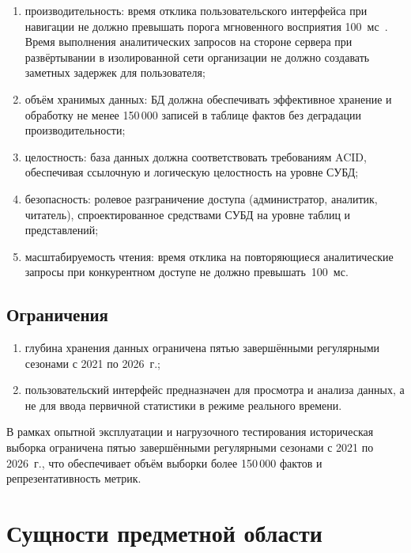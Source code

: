 \begin{enumerate}
    \item производительность: время отклика пользовательского интерфейса
          при навигации не должно превышать порога мгновенного восприятия
          100~мс~\cite{nielsen93}. Время выполнения аналитических запросов
          на стороне сервера при развёртывании в изолированной сети организации
          не должно создавать заметных задержек для пользователя;
    \item объём хранимых данных: БД должна обеспечивать эффективное хранение
          и обработку не менее 150\,000 записей в таблице фактов без
          деградации производительности;
    \item целостность: база данных должна соответствовать требованиям
          ACID, обеспечивая ссылочную и логическую целостность на уровне СУБД;
    \item безопасность: ролевое разграничение доступа (администратор,
          аналитик, читатель), спроектированное средствами СУБД на уровне таблиц
          и представлений;
    \item масштабируемость чтения: время отклика на повторяющиеся аналитические
          запросы при конкурентном доступе не должно превышать~100~мс.
\end{enumerate}

\subsection{Ограничения}

\begin{enumerate}
    \item глубина хранения данных ограничена пятью завершёнными регулярными
          сезонами с 2021 по 2026~г.;
    \item пользовательский интерфейс предназначен для просмотра и анализа
          данных, а не для ввода первичной статистики в режиме реального времени.
\end{enumerate}

В рамках опытной эксплуатации и нагрузочного тестирования историческая выборка
ограничена пятью завершёнными регулярными сезонами с 2021 по 2026~г., что
обеспечивает объём выборки более 150\,000 фактов и репрезентативность метрик.

\section{Сущности предметной области}

